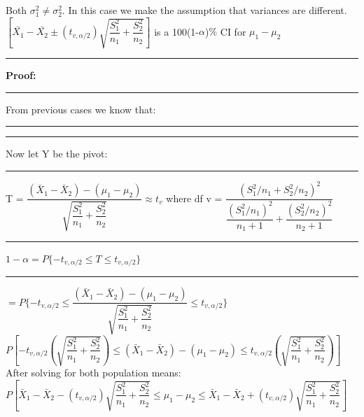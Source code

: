 \documentclass[]{article}
\begin{document}
\newline Both  $\sigma^2_1 \ne \sigma^2_2$. In this case we make the assumption that variances are different.
\newline
\newline
$\left[ \bar{X_{1}} - \bar{X_{2}} \pm \left( t_{v, \alpha / 2 }  \right) \sqrt{\dfrac{S^2_1}{n_1} + \dfrac{S^2_2}{n_2}    }      \right] $ is a 100(1-$\alpha$)$\%$ CI for $\mu_1 - \mu_2$ 
\newline 
\newline
\newline\Large\rule{3.0cm}{0pt} \textbf{Proof:}
\newline\Large\rule{3.0cm}{0pt} From previous cases we know that:
\newline\Large\rule{3.0cm}{0pt}     
\newline\newline\Large\rule{3.0cm}{0pt} Now let Y be the  pivot:
\newline\newline\Large\rule{3.0cm}{0pt} T = $\dfrac{  (  \bar{X}_1 - \bar{X}_2 )  -  (\mu_1 - \mu_2)   }{\sqrt{\dfrac{S^2_1}{n_1} + \dfrac{S^2_2}{n_2}}} \approx t_{v}$ 
where df
v = $\dfrac{  (  S^2_1 / n_1  + S^2_2 / n_2  )^2  }{  \dfrac{(S^2_1 / n_1)^2}{n_1 +1}   +  \dfrac{(S^2_2 / n_2)^2}{n_2 +1}    }$
\newline
\newline 
\newline\Large\rule{3.0cm}{0pt} $1 - \alpha = P \{ -t_{v, \alpha / 2} \le T \le t_{v, \alpha / 2} \}$ 
\newline
\newline
\newline\Large\rule{4.3cm}{0pt} $ = P \{ -t_{v, \alpha / 2} \le \dfrac{  (  \bar{X}_1 - \bar{X}_2 )  -  (\mu_1 - \mu_2)   }{\sqrt{\dfrac{S^2_1}{n_1} + \dfrac{S^2_2}{n_2}}}  \le t_{v, \alpha /2} \}$
\newline
\newline
\newline
$P \left[  -t_{v, \alpha / 2} \left( \sqrt{\dfrac{S^2_1}{n_1} + \dfrac{S^2_2}{n_2}} \right) \le  (  \bar{X}_1 - \bar{X}_2 )  -  (\mu_1 - \mu_2) \le t_{v, \alpha /2} \left( \sqrt{\dfrac{S^2_1}{n_1} + \dfrac{S^2_2}{n_2}} \right)  \right]$
\newline
\newline
\newline After solving for both population means:
\newline
\newline$P \left[ \bar{X}_1 - \bar{X}_2 - ( t_{v, \alpha / 2} )  \sqrt{\dfrac{S^2_1}{n_1} + \dfrac{S^2_2}{n_2}}  \le  \mu_1 - \mu_2 \le \bar{X}_1 - \bar{X}_2  + ( t_{v, \alpha /2} ) \sqrt{\dfrac{S^2_1}{n_1} + \dfrac{S^2_2}{n_2}}  \right]$
 
\section{}
\end{document}
